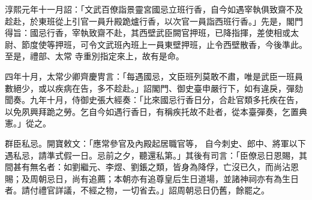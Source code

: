 \begin{pinyinscope}
 淳熙元年十一月詔：「文武百僚詣景靈宮國忌立班行香，自今如遇宰執俱致齋不及趁赴，於東班從上引官一員升殿跪爐行香，以次官一員詣西班行香。」先是，閣門得旨：國忌行香，宰執致齋不赴，其西壁武臣闕官押班，已降指揮，差使相或太尉、節度使等押班，可令文武班內班上一員東壁押班，止令西壁散香，今後準此。至是，禮部、太常
 寺重別指定來上，故有是命。



 四年十月，太常少卿齊慶冑言：「每遇國忌，文臣班列莫敢不肅，唯是武臣一班員數絕少，或以疾病在告，多不趁赴。」詔閣門、御史臺申嚴行下，如有違戾，彈劾聞奏。九年十月，侍御史張大經奏：「比來國忌行香日分，合赴官類多托疾在告，以免夙興拜跪之勞。乞自今如遇行香日，有稱疾托故不赴者，從本臺彈奏，乞置典憲。」從之。



 群臣私忌。開寶敕文：「應常參官及內殿起居職官等，
 自今刺史、郎中、將軍以下遇私忌，請準式假一日。忌前之夕，聽還私第。」其後有司言：「臣僚忌日恩賜，其間甚有無名者：如劉繼元、李煜、劉鋹之類，皆身為降俘，亡沒已久，而尚沾恩賜；及周朝忌日，尚有追薦；本朝亦有追尊皇后生日道場，並諸神祠亦有為生日者。請付禮官詳議，不經之物，一切省去。」詔周朝忌日仍舊，餘罷之。



\end{pinyinscope}